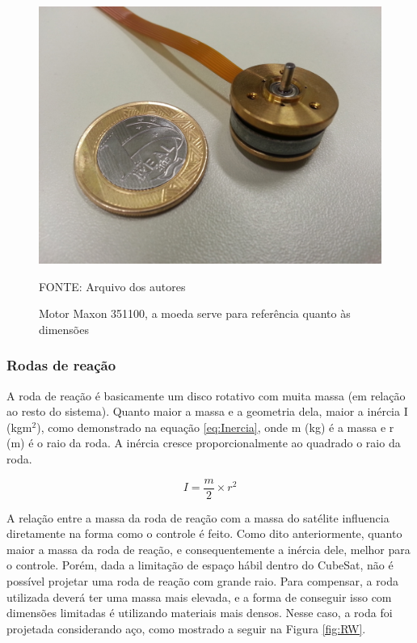 \documentclass[
	12pt,				%
	openany,			%
	twoside,			%
	a4paper,			%
	english,			%
	french,				%
	spanish,			%
	brazil,				%
	oldfontcommands
	]{abntex2}
\begin{document}
\begin{figure}[th]
	\caption{Motor Maxon 351100, a moeda serve para referência quanto às dimensões}
	\centering
	\includegraphics[width=0.8\linewidth]{./figs/Maxon_351100}
	
	\begin{small}
		FONTE: Arquivo dos autores
	\end{small}
	\label{fig:Maxon}
\end{figure}

\subsubsection{Rodas de reação}

A roda de reação é basicamente um disco rotativo com muita massa (em relação ao resto do sistema). Quanto maior a massa e a geometria dela, maior a inércia I (kgm$^2$), como demonstrado na equação \ref{eq:Inercia}, onde m (kg) é a massa e r (m) é o raio da roda. A inércia cresce proporcionalmente ao quadrado o raio da roda.

\begin{equation}
I= \frac{m}{2} \times r^2
\label{eq:Inercia}
\end{equation}

A relação entre a massa da roda de reação com a massa do satélite influencia diretamente na forma como o controle é feito. Como dito anteriormente, quanto maior a massa da roda de reação, e consequentemente a inércia dele, melhor para o controle. Porém, dada a limitação de espaço hábil dentro do CubeSat, não é possível projetar uma roda de reação com grande raio. Para compensar, a roda utilizada deverá ter uma massa mais elevada, e a forma de conseguir isso com dimensões limitadas é utilizando materiais mais densos. Nesse caso, a roda foi projetada considerando aço, como mostrado a seguir na Figura \ref{fig:RW}.
\end{document}
